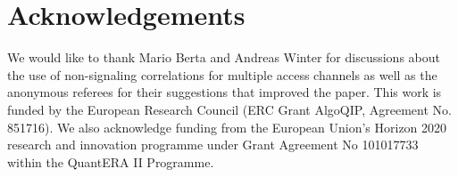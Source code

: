\documentclass[11pt]{article}
\theoremstyle{definition}
\theoremstyle{remark}
\begin{document}
\section*{Acknowledgements}
We would like to thank Mario Berta and Andreas Winter for discussions about the use of non-signaling correlations for multiple access channels as well as the anonymous referees for their suggestions that improved the paper.
This work is funded by the European Research Council (ERC Grant AlgoQIP, Agreement No. 851716). We also acknowledge funding from the European Union’s Horizon 2020 research and innovation programme under Grant Agreement No 101017733 within the QuantERA II Programme.



\end{document}
